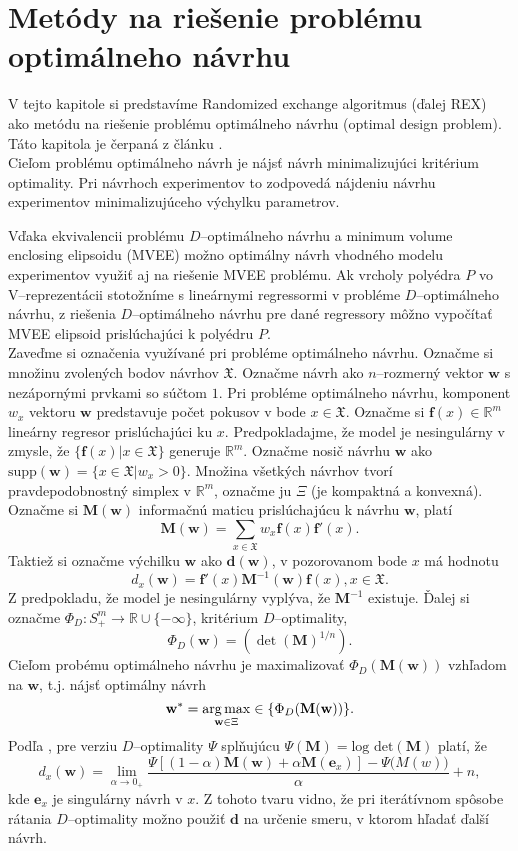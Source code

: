 \chapter{Metódy na riešenie problému optimálneho návrhu}

V tejto kapitole si predstavíme Randomized exchange algoritmus \cite{rex_harman} (ďalej REX) ako metódu na riešenie problému optimálneho návrhu (optimal design problem). Táto kapitola je čerpaná z článku \cite{rex_harman}. \\

Cieľom problému optimálneho návrh je nájsť návrh minimalizujúci kritérium optimality. Pri návrhoch experimentov to zodpovedá nájdeniu návrhu experimentov minimalizujúceho výchylku parametrov.

Vďaka ekvivalencii problému $D$--optimálneho návrhu a minimum volume enclosing elipsoidu (MVEE) možno optimálny návrh vhodného modelu experimentov využiť aj na riešenie MVEE problému. Ak vrcholy polyédra $P$ vo V--reprezentácii stotožníme s lineárnymi regressormi v probléme $D$--optimálneho návrhu, z riešenia $D$--optimálneho návrhu pre dané regressory môžno vypočítať MVEE elipsoid prislúchajúci k polyédru $P$.\\

Zaveďme si označenia využívané pri probléme optimálneho návrhu. Označme si množinu zvolených bodov návrhov $\mathfrak X$.
Označme návrh ako $n$--rozmerný vektor $\mathbf{w}$ s nezápornými prvkami so súčtom $1$. Pri probléme optimálneho návrhu, komponent $w_x$ vektoru $\mathbf{w}$ predstavuje počet pokusov v bode $x \in \mathfrak X$.
Označme si $\mathbf{f}(x)\in \mathbb{R}^m$ lineárny regresor prislúchajúci ku $x$. Predpokladajme, že model je nesingulárny v zmysle, že $\{ \mathbf f(x)|x \in \mathfrak X \}$ generuje $\mathbb R^m$.
Označme nosič návrhu $\mathbf{w}$ ako $\text{supp}(\mathbf{w})=\{x \in \mathfrak{X}| w_x>0\}$. 
Množina všetkých návrhov tvorí pravdepodobnostný simplex v $\mathbb{R}^m$, označme ju $\Xi$ (je kompaktná a konvexná).
Označme si $\mathbf{M(w)}$ informačnú maticu prislúchajúcu k návrhu $\mathbf w$, platí $$\mathbf{M(w)}=\sum_{x\in \mathfrak X}w_x \mathbf{f}(x)\mathbf{f'}(x).$$
Taktiež si označme výchilku $\mathbf w$ ako $\mathbf {d(w)}$, v pozorovanom bode $x$ má hodnotu $$d_x(\mathbf w)=\mathbf {f'}(x)\mathbf M^{-1}(\mathbf w)\mathbf f(x), x \in \mathfrak X.$$ Z predpokladu, že model je nesingulárny vyplýva, že $\mathbf M^{-1}$ existuje.
Ďalej si označme $\Phi_D: S^m_+ \rightarrow \mathbb{R} \cup \{-\infty\}$, kritérium $D$--optimality, $$\Phi_D(\mathbf{w})=(\det(\mathbf{M})^{1/n}).$$
Cieľom probému optimálneho návrhu je maximalizovať $\Phi_D(\mathbf{M(w)})$ vzhľadom na $\mathbf w$, t.j. nájsť optimálny návrh $$\mathbf{w^*} = \operatorname*{arg\,max}_{\mathbf{w} \in \Xi} \in \{\Phi_D(\mathbf{M(w)})\}.$$ Podľa \cite{rex_harman}, pre verziu $D$--optimality $\Psi$ splňujúcu $\Psi(\mathbf M)= \text{log det}(\mathbf M)$ platí, že $$d_x(\mathbf w)= \lim_{\alpha \rightarrow 0_+} \frac{\Psi[(1-\alpha)\mathbf{M(w)}+\alpha\mathbf M(\mathbf e_x)]-\Psi\mathbf(M(w))}{\alpha}+n,$$ kde $\mathbf e_x$ je singulárny návrh v $x$. Z tohoto tvaru vidno, že pri iterátívnom spôsobe rátania $D$--optimality možno použiť $\mathbf d$ na určenie smeru, v ktorom hľadať ďalší návrh.

